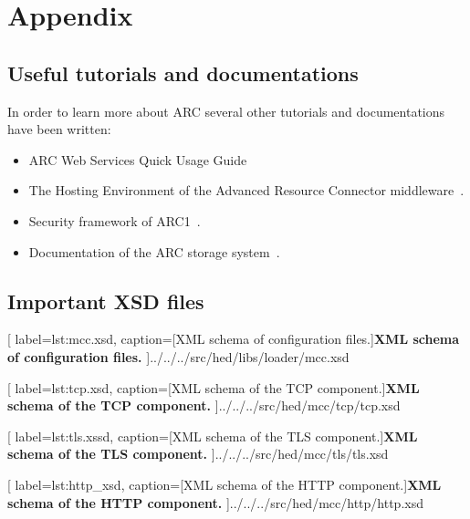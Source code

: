 \chapter{Appendix}

\section{Useful tutorials and documentations}

In order to learn more about ARC several other tutorials and documentations have been written:
\begin{itemize}
 \item ARC Web Services Quick Usage Guide~\cite{2008_UNKNOWN}
 \item The Hosting Environment of the Advanced Resource Connector middleware~\cite{2008_Cameron}.
 \item Security framework of ARC1~\cite{QIANG_2008}.
 \item Documentation of the ARC storage system~\cite{Nagy_2008}.
 


\end{itemize}




\section{Important XSD files}\label{sec:impXSD}


	[
	label=lst:mcc.xsd,
	caption={[XML schema of configuration files.]\textbf{XML schema of configuration files.}}
	]{../../../src/hed/libs/loader/mcc.xsd}


	[
	label=lst:tcp.xsd,
	caption={[XML schema of the TCP component.]\textbf{XML schema of the TCP component.}}
	]{../../../src/hed/mcc/tcp/tcp.xsd}


	[
	label=lst:tls.xssd,
	caption={[XML schema of the TLS component.]\textbf{XML schema of  the TLS component.}}
	]{../../../src/hed/mcc/tls/tls.xsd}


	[
	label=lst:http_xsd,
	caption={[XML schema of the HTTP component.]\textbf{XML schema of the HTTP component.}}
	]{../../../src/hed/mcc/http/http.xsd}









